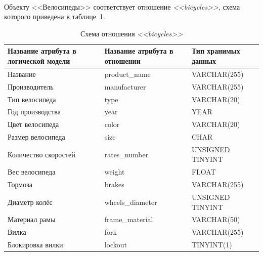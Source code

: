 \paragraph{}
Объекту <<Велосипеды>> соответствует отношение \textit{<<bicycles>>}, схема которого приведена в
таблице~\ref{tbl:bicycles_scheme}.
\begin{table}[h!]
  \caption{Схема отношения \textit{<<bicycles>>}}
  \label{tbl:bicycles_scheme}
  \small{
    \centering
    \begin{tabular}{| p{} | p{} | p{} |}
      \hline
      Название атрибута в \newline логической модели &
      Название атрибута в \newline отношении &
      Тип хранимых данных \\

      \hline
      Название & product\_name & VARCHAR(255) \\

      \hline
      Производитель & manufacturer & VARCHAR(255) \\

      \hline
      Тип велосипеда & type & VARCHAR(20) \\

      \hline
      Год производства & year & YEAR \\

      \hline
      Цвет велосипеда & color & VARCHAR(20) \\

      \hline
      Размер велосипеда & size & CHAR \\

      \hline
      Количество скоростей & rates\_number & UNSIGNED TINYINT \\

      \hline
      Вес велосипеда & weight & FLOAT \\

      \hline
      Тормоза & brakes & VARCHAR(255) \\

      \hline
      Диаметр колёс & wheels\_diameter & UNSIGNED TINYINT \\

      \hline
      Материал рамы & frame\_material & VARCHAR(50) \\

      \hline
      Вилка & fork & VARCHAR(255) \\

      \hline
      Блокировка вилки & lockout & TINYINT(1) \\


\end{tabular}}
\end{table}
